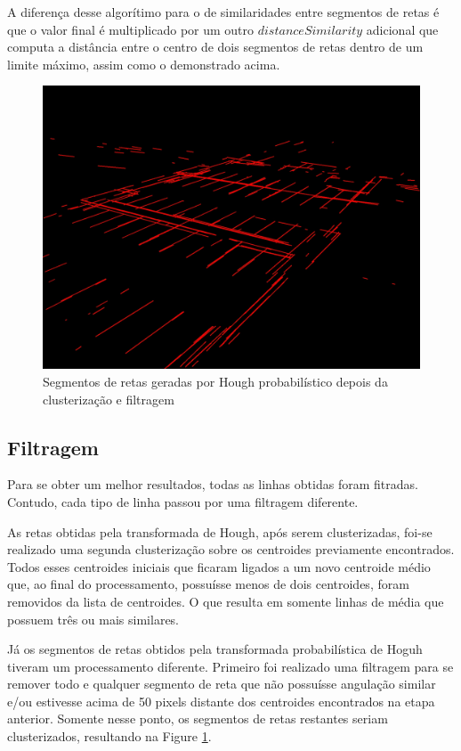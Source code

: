 \documentclass[10pt,twocolumn,letterpaper]{article}
\begin{document}
	A diferença desse algorítimo para o de similaridades entre segmentos de retas é que
o valor final é multiplicado por um outro $distanceSimilarity$ adicional que computa a distância
entre o centro de dois segmentos de retas dentro de um limite máximo, assim como o
demonstrado acima.

\begin{figure}[!htp]
\centering
\includegraphics[width=\columnwidth]{hough-segmentolinhas-cluster.jpg}
 \caption{Segmentos de retas geradas por Hough probabilístico depois da clusterização e filtragem}
\label{fig:segcluster}
\end{figure}

\subsection{Filtragem}

	Para se obter um melhor resultados, todas as linhas obtidas foram fitradas. Contudo,
cada tipo de linha passou por uma filtragem diferente.

	As retas obtidas pela transformada de Hough, após serem clusterizadas, foi-se realizado
uma segunda clusterização sobre os centroides previamente encontrados. Todos esses centroides
iniciais que ficaram ligados a um novo centroide médio que, ao final do processamento, possuísse
menos de dois centroides, foram removidos da lista de centroides. O que resulta em somente
linhas de média que possuem três ou mais similares.

	Já os segmentos de retas obtidos pela transformada probabilística de Hoguh tiveram um
processamento diferente. Primeiro foi realizado uma filtragem para se remover todo e qualquer
segmento de reta que não possuísse angulação similar e/ou estivesse acima de 50 pixels distante
dos centroides encontrados na etapa anterior. Somente nesse ponto, os segmentos de retas
restantes seriam clusterizados, resultando na Figure \ref{fig:segcluster}.
\end{document}
